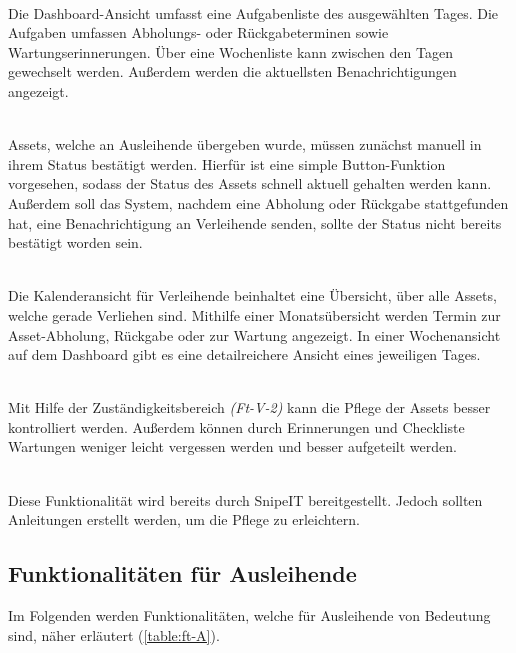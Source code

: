 {\sffamily\color{maincolor}{Ft-V-1 | Dashboard }}\\
Die Dashboard-Ansicht umfasst eine Aufgabenliste des ausgewählten Tages. Die Aufgaben umfassen
Abholungs- oder Rückgabeterminen sowie Wartungserinnerungen. Über eine Wochenliste kann zwischen
den Tagen gewechselt werden. Außerdem werden die aktuellsten Benachrichtigungen angezeigt.

{\sffamily\color{maincolor}{Ft-V-2 | Bearbeiten des Assetstatus }}\\
Assets, welche an Ausleihende übergeben wurde, müssen zunächst manuell in ihrem Status bestätigt
werden. Hierfür ist eine simple Button-Funktion vorgesehen, sodass der Status des Assets schnell aktuell
gehalten werden kann. Außerdem soll das System, nachdem eine Abholung oder Rückgabe stattgefunden
hat, eine Benachrichtigung an Verleihende senden, sollte der Status nicht bereits bestätigt worden
sein.

{\sffamily\color{maincolor}{Ft-B-4 | Kalenderansicht für Verleihende}}\\
Die Kalenderansicht für Verleihende beinhaltet eine Übersicht, über alle Assets, welche gerade
Verliehen sind. Mithilfe einer Monatsübersicht werden Termin zur Asset-Abholung, Rückgabe oder zur
Wartung angezeigt. In einer Wochenansicht auf dem Dashboard gibt es eine detailreichere Ansicht
eines jeweiligen Tages.


    {\sffamily\color{maincolor}{Ft-V-3 | Pflege von Assets   }}\\
Mit Hilfe der Zuständigkeitsbereich \textit{(Ft-V-2)} kann die Pflege der Assets besser kontrolliert
werden. Außerdem können durch Erinnerungen und Checkliste Wartungen weniger leicht vergessen werden
und besser aufgeteilt werden. 


    {\sffamily\color{maincolor}{Ft-V-4 | Pflege der Datenbank }}\\
    Diese Funktionalität wird bereits durch SnipeIT bereitgestellt. Jedoch sollten Anleitungen
erstellt werden, um die Pflege zu erleichtern. 

\subsection{Funktionalitäten für Ausleihende}
Im Folgenden werden Funktionalitäten, welche für Ausleihende von Bedeutung sind, näher erläutert
(\ref{table:ft-A}).

